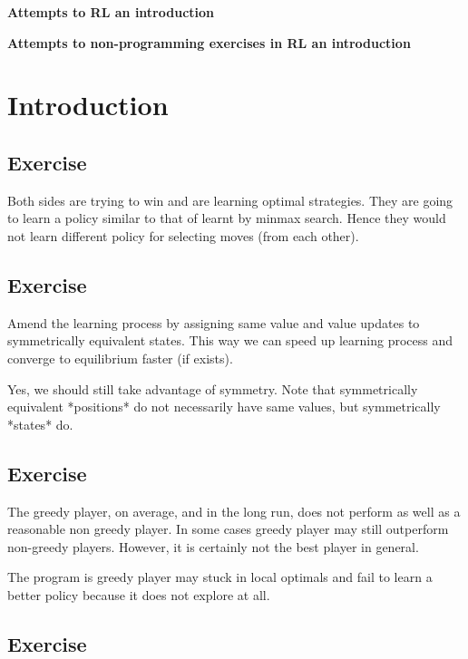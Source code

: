 \documentclass[11pt,a4paper]{report}
\begin{document}
\clearpage
\thispagestyle{empty}
\begin{center}\LARGE\bf
	Attempts to RL an introduction
\end{center}
\newpage
\setcounter{page}{1}
\begin{center}\Large\bf
	Attempts to non-programming exercises in RL an introduction
\end{center}

\chapter{Introduction}

\section{Exercise}
Both sides are trying to win and are learning optimal strategies. They are going to learn a policy similar to that of learnt by minmax search. Hence they would not learn different policy for selecting moves (from each other).

\section{Exercise}

Amend the learning process by assigning same value and value updates to symmetrically equivalent states. This way we can speed up learning process and converge to equilibrium faster (if exists). 

Yes, we should still take advantage of symmetry. Note that symmetrically equivalent *positions* do not necessarily have same values, but symmetrically *states* do.

\section{Exercise}

The greedy player, on average, and in the long run, does not perform as well as a reasonable non greedy player. In some cases greedy player may still outperform non-greedy players. However, it is certainly not the best player in general.

The program is greedy player may stuck in local optimals and fail to learn a better policy because it does not explore at all.

\section{Exercise}
\end{document}
